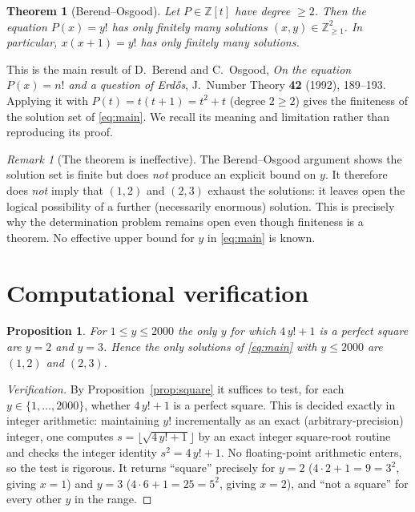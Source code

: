 \documentclass{amsart}
\theoremstyle{plain}
\newtheorem{theorem}{Theorem}
\newtheorem{proposition}{Proposition}
\theoremstyle{remark}
\newtheorem{remark}{Remark}
\begin{document}
\begin{theorem}[Berend--Osgood]\label{thm:finite}
Let $P\in\mathbb{Z}[t]$ have degree $\ge 2$.  Then the equation $P(x)=y!$
has only finitely many solutions $(x,y)\in\mathbb{Z}_{\ge 1}^2$.  In
particular, $x(x+1)=y!$ has only finitely many solutions.
\end{theorem}

This is the main result of D.~Berend and C.~Osgood, \emph{On the equation
$P(x)=n!$ and a question of Erd\H{o}s}, J.\ Number Theory \textbf{42}
(1992), 189--193.  Applying it with $P(t)=t(t+1)=t^2+t$ (degree $2\ge2$)
gives the finiteness of the solution set of \eqref{eq:main}. We recall its
meaning and limitation rather than reproducing its proof.

\begin{remark}[The theorem is ineffective]\label{rem:ineff}
The Berend--Osgood argument shows the solution set is finite but does
\emph{not} produce an explicit bound on $y$. It therefore does \emph{not}
imply that $(1,2)$ and $(2,3)$ exhaust the solutions: it leaves open the
logical possibility of a further (necessarily enormous) solution. This is
precisely why the determination problem remains open even though finiteness
is a theorem. No effective upper bound for $y$ in \eqref{eq:main} is known.
\end{remark}

\section{Computational verification}\label{sec:comput}

\begin{proposition}\label{prop:comp}
For $1\le y\le 2000$ the only $y$ for which $4\,y!+1$ is a perfect square
are $y=2$ and $y=3$.  Hence the only solutions of \eqref{eq:main} with
$y\le 2000$ are $(1,2)$ and $(2,3)$.
\end{proposition}

\begin{proof}[Verification]
By Proposition~\ref{prop:square} it suffices to test, for each
$y\in\{1,\dots,2000\}$, whether $4\,y!+1$ is a perfect square.  This is
decided exactly in integer arithmetic: maintaining $y!$ incrementally as an
exact (arbitrary-precision) integer, one computes
$s=\lfloor\sqrt{4\,y!+1}\rfloor$ by an exact integer square-root routine and
checks the integer identity $s^2=4\,y!+1$.  No floating-point arithmetic
enters, so the test is rigorous.  It returns ``square'' precisely for $y=2$
($4\cdot 2+1=9=3^2$, giving $x=1$) and $y=3$ ($4\cdot 6+1=25=5^2$, giving
$x=2$), and ``not a square'' for every other $y$ in the range.
\end{proof}
\end{document}
